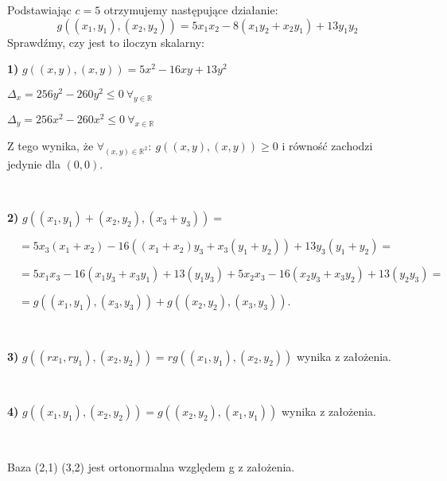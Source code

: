 \documentclass{article}
\begin{document}
Podstawiając $c=5$ otrzymujemy następujące działanie: $$g((x_1,y_1),(x_2,y_2))=5x_1x_2-8(x_1y_2+x_2y_1)+13y_1y_2$$
Sprawdźmy, czy jest to iloczyn skalarny:
\begin{flushleft}
\textbf{1)} $g((x,y),(x,y))=5x^2-16xy+13y^2$

\quad $\Delta_x=256y^2-260y^2\leq0\ \forall_{y\in\mathds{R}}$

\quad $\Delta_y=256x^2-260x^2\leq0\ \forall_{x\in\mathds{R}}$

Z tego wynika, że $\forall_{(x,y)\in\mathds{R}^2}:\ g((x,y),(x,y))\geq0$ i równość zachodzi jedynie dla $(0,0)$.

\ 

\textbf{2)} $g((x_1,y_1)+(x_2,y_2),(x_3+y_3))=$

$\quad=5x_3(x_1+x_2)-16((x_1+x_2)y_3+x_3(y_1+y_2))+13y_3(y_1+y_2)=$ 

$\quad=5x_1x_3-16(x_1y_3+x_3y_1)+13(y_1y_3)+5x_2x_3-16(x_2y_3+x_3y_2)+13(y_2y_3)=$

$\quad=g((x_1,y_1),(x_3,y_3))+g((x_2,y_2),(x_3,y_3)).$

\ 

\textbf{3)} $g((rx_1,ry_1),(x_2,y_2))=rg((x_1,y_1),(x_2,y_2))$ wynika z założenia.

\ 

\textbf{4)} $g((x_1,y_1),(x_2,y_2))=g((x_2,y_2),(x_1,y_1))$ wynika z założenia.

\ 

Baza (2,1) (3,2) jest ortonormalna względem g z założenia.
\end{flushleft}
\end{document}
